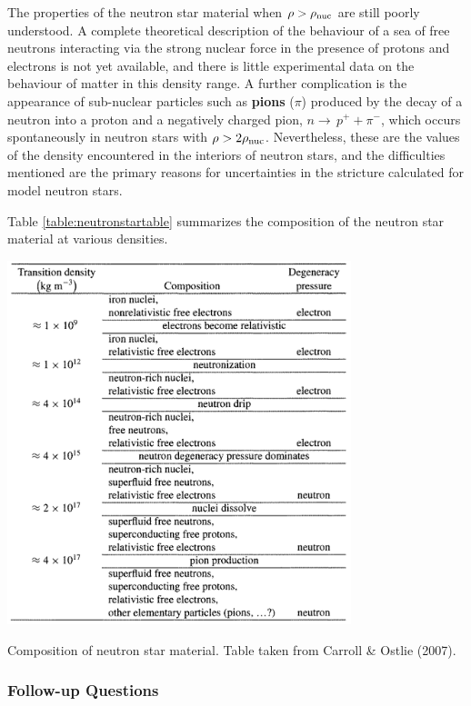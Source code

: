 \documentclass[a4paper,10pt]{article}
\begin{document}
{\noindent}The properties of the neutron star material when $\rho>\rho_{\rm nuc}$ are still poorly understood. A complete theoretical description of the behaviour of a sea of free neutrons interacting via the strong nuclear force in the presence of protons and electrons is not yet available, and there is little experimental data on the behaviour of matter in this density range. A further complication is the appearance of sub-nuclear particles such as \textbf{pions} ($\pi$) produced by the decay of a neutron into a proton and a negatively charged pion, $n\rightarrow\,p^++\pi^-$, which occurs spontaneously in neutron stars with $\rho>2\rho_{\rm nuc}$. Nevertheless, these are the values of the density encountered in the interiors of neutron stars, and the difficulties mentioned are the primary reasons for uncertainties in the stricture calculated for model neutron stars.

{\noindent}Table \ref{table:neutronstartable} summarizes the composition of the neutron star material at various densities.

\begin{table}[t]
    \centering
    \includegraphics[width=10cm]{figures/NeutronStar_table.png}
    \caption{\footnotesize{Composition of neutron star material. Table taken from Carroll \& Ostlie (2007).}}
    \label{table:neutronstartable}
\end{table}

\subsubsection{Follow-up Questions}
\end{document}
